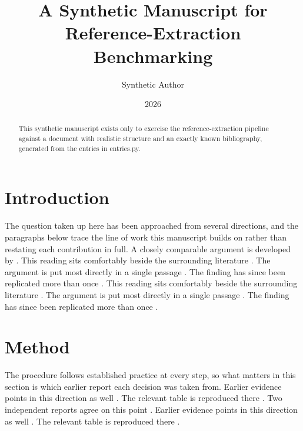 \documentclass{article}
\title{A Synthetic Manuscript for Reference-Extraction Benchmarking}
\author{Synthetic Author}
\date{2026}
\begin{document}
\maketitle

\begin{abstract}
This synthetic manuscript exists only to exercise the reference-extraction pipeline against a document with realistic structure and an exactly known bibliography, generated from the entries in entries.py.
\end{abstract}

\section{Introduction}
The question taken up here has been approached from several directions, and the paragraphs below trace the line of work this manuscript builds on rather than restating each contribution in full. A closely comparable argument is developed by \textcite{dollhill1950smoking}. This reading sits comfortably beside the surrounding literature \parencite{watsoncrick1953molecular}. The argument is put most directly in a single passage \parencite[p.~14]{yusuf2004interheart}. The finding has since been replicated more than once \parencite{mckhann1984clinical,barker1990fetal}. This reading sits comfortably beside the surrounding literature \parencite{marshallwarren1984unidentified}. The argument is put most directly in a single passage \parencite[p.~14]{fleming1929antibacterial}. The finding has since been replicated more than once \parencite{enders1949cultivation,dawber1951epidemiological}.

\section{Method}
The procedure follows established practice at every step, so what matters in this section is which earlier report each decision was taken from. Earlier evidence points in this direction as well \parencite{who2019report}. The relevant table is reproduced there \parencite[p.~87]{snow1855mode}. Two independent reports agree on this point \parencite{jenner1798inquiry,selye1936syndrome}. Earlier evidence points in this direction as well \parencite{zinkernageldoherty1974restriction}. The relevant table is reproduced there \parencite[p.~87]{prusiner1982novel}.
\end{document}

